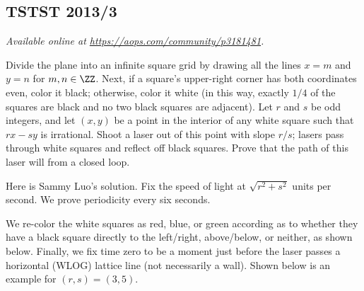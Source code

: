 \documentclass[11pt]{scrartcl}
\begin{document}
\subsection{TSTST 2013/3}
\textsl{Available online at \url{https://aops.com/community/p3181481}.}
\begin{mdframed}[style=mdpurplebox,frametitle={Problem statement}]
Divide the plane into an infinite square grid by drawing
all the lines $x=m$ and $y=n$ for $m,n \in \ZZ$.
Next, if a square's upper-right corner has both coordinates even, color it black;
otherwise, color it white (in this way, exactly $1/4$ of the squares are black
and no two black squares are adjacent).
Let $r$ and $s$ be odd integers,
and let $(x,y)$ be a point in the interior of any white square
such that $rx-sy$ is irrational.
Shoot a laser out of this point with slope $r/s$;
lasers pass through white squares and reflect off black squares.
Prove that the path of this laser will from a closed loop.
\end{mdframed}
Here is Sammy Luo's solution.
Fix the speed of light at $\sqrt{r^2+s^2}$ units per second.
We prove periodicity every six seconds.

We re-color the white squares as red, blue, or green
according as to whether they have a black square directly
to the left/right, above/below, or neither, as shown below.
Finally, we fix time zero to be a moment just before the laser passes
a horizontal (WLOG) lattice line (not necessarily a wall).
Shown below is an example for $(r,s) = (3,5)$.
\end{document}
